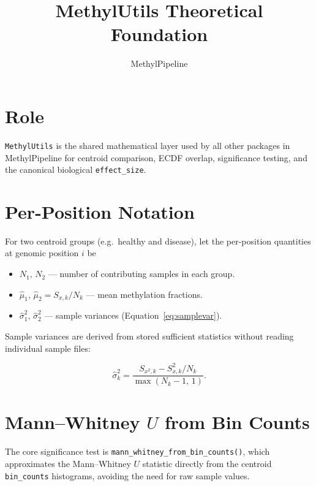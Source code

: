 \documentclass[11pt]{article}
\title{MethylUtils Theoretical Foundation}
\author{MethylPipeline}
\date{}
\begin{document}
\maketitle
\tableofcontents
\newpage

\section{Role}

\texttt{MethylUtils} is the shared mathematical layer used by all other
packages in MethylPipeline for centroid comparison, ECDF overlap, significance
testing, and the canonical biological \texttt{effect\_size}.

\section{Per-Position Notation}

For two centroid groups (e.g.\ healthy and disease), let the per-position
quantities at genomic position $i$ be

\begin{itemize}
  \item \(N_1,\,N_2\) --- number of contributing samples in each group.
  \item \(\hat\mu_1,\,\hat\mu_2 = S_{x,k}/N_k\) --- mean methylation fractions.
  \item \(\hat\sigma_1^2,\,\hat\sigma_2^2\) --- sample variances
        (Equation~\eqref{eq:samplevar}).
\end{itemize}

Sample variances are derived from stored sufficient statistics without
reading individual sample files:

\begin{equation}
  \hat\sigma_k^2 = \frac{S_{x^2,k} - S_{x,k}^2/N_k}{\max(N_k-1,\,1)}.
  \label{eq:samplevar}
\end{equation}

\section{Mann--Whitney $U$ from Bin Counts}

The core significance test is \texttt{mann\_whitney\_from\_bin\_counts()},
which approximates the Mann--Whitney $U$ statistic directly from the centroid
\texttt{bin\_counts} histograms, avoiding the need for raw sample values.
\end{document}
